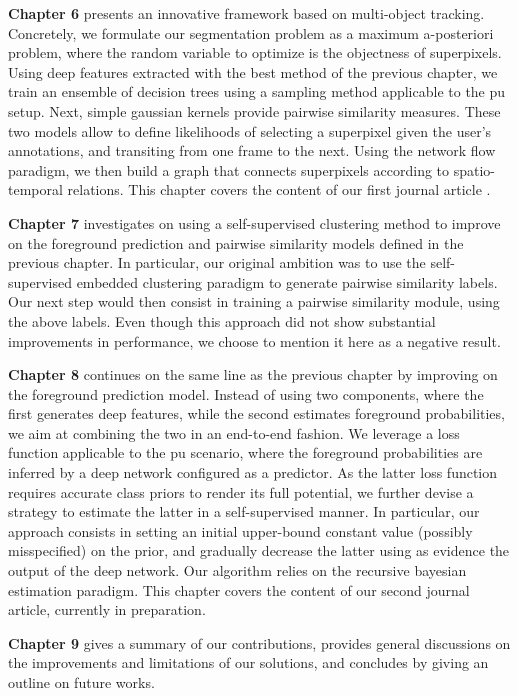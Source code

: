 \textbf{Chapter 6} presents an innovative framework based on multi-object tracking.
Concretely, we formulate our segmentation problem as a maximum a-posteriori problem, where the random variable to optimize is the objectness of superpixels.
Using deep features extracted with the best method of the previous chapter, we train an ensemble of decision trees using a sampling method applicable to the \gls{pu} setup.
Next, simple gaussian kernels provide pairwise similarity measures.
These two models allow to define likelihoods of selecting a superpixel given the user's annotations, and transiting from one frame to the next.
Using the network flow paradigm, we then build a graph that connects superpixels according to spatio-temporal relations.
This chapter covers the content of our first journal article \cite{lejeune18}.

\textbf{Chapter 7} investigates on using a self-supervised clustering method to improve on the foreground prediction and pairwise similarity models defined in the previous chapter.
In particular, our original ambition was to use the self-supervised embedded clustering paradigm to generate pairwise similarity labels.
Our next step would then consist in training a pairwise similarity module, using the above labels.
Even though this approach did not show substantial improvements in performance, we choose to mention it here as a negative result.

\textbf{Chapter 8} continues on the same line as the previous chapter by improving on the foreground prediction model.
Instead of using two components, where the first generates deep features, while the second estimates foreground probabilities, we aim at combining the two in an end-to-end fashion.
We leverage a loss function applicable to the \gls{pu} scenario, where the foreground probabilities are inferred by a deep network configured as a predictor.
As the latter loss function requires accurate class priors to render its full potential, we further devise a strategy to estimate the latter in a self-supervised manner.
In particular, our approach consists in setting an initial upper-bound constant value (possibly misspecified) on the prior, and gradually decrease the latter using as evidence the output of the deep network.
Our algorithm relies on the recursive bayesian estimation paradigm.
This chapter covers the content of our second journal article, currently in preparation.

\textbf{Chapter 9} gives a summary of our contributions, provides general discussions on the improvements and limitations of our solutions, and concludes by giving an outline on future works.

